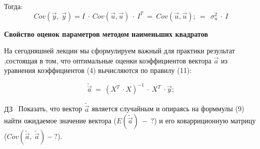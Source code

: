 \documentclass[12pt,a4paper]{article}
\begin{document}
Тогда:
\begin{equation*}
Cov\left(\vec{y} ,\ \vec{y}\right) =I\ \cdot \ Cov\left(\vec{u} ,\vec{u}\right) \ \cdot \ I^{T} \ =\ Cov\left(\vec{u} ,\vec{u}\right) ;\ =\ \ \sigma ^{2}_{u} \ \cdot \ I
\end{equation*}
\begin{center}

\textbf{Свойство оценок параметров методом наименьших квадратов}
\end{center}
На сегодняшней лекции мы сформулируем важный для практики результат $ $,состоящая в том, что оптимальные оценки коэффициентов вектора $\displaystyle \vec{a}$ из уравнения коэффициентов (4) вычисляются по правилу (11):


\begin{equation*}
\widetilde{\vec{a}} \ =\ \left( X^{T} \ \cdot X\right)^{-1} \ \cdot \ X^{T} \ \cdot \vec{y} ;
\end{equation*}


$\displaystyle \boxed{\text{ДЗ}}$ \ Показать, что вектор $\displaystyle \widetilde{\vec{a}}$ является случайным и опираясь на форммулы (9) найти ожидаемое значение вектора ($\displaystyle E\left(\widetilde{\vec{a}}\right) \ -\ ?$) и его коварриционную матрицу ($\displaystyle Cov\left(\widetilde{\vec{a}} ,\ \widetilde{\vec{a}}\right) -?$).
\end{document}
